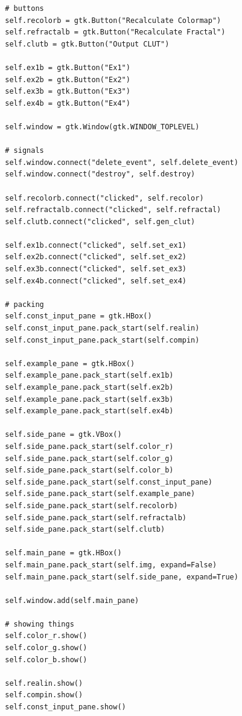 \documentclass{article}
\begin{document}
\begin{lstlisting}
        # buttons
        self.recolorb = gtk.Button("Recalculate Colormap")
        self.refractalb = gtk.Button("Recalculate Fractal")
        self.clutb = gtk.Button("Output CLUT")

        self.ex1b = gtk.Button("Ex1")
        self.ex2b = gtk.Button("Ex2")
        self.ex3b = gtk.Button("Ex3")
        self.ex4b = gtk.Button("Ex4")

        self.window = gtk.Window(gtk.WINDOW_TOPLEVEL)

        # signals
        self.window.connect("delete_event", self.delete_event)
        self.window.connect("destroy", self.destroy)

        self.recolorb.connect("clicked", self.recolor)
        self.refractalb.connect("clicked", self.refractal)
        self.clutb.connect("clicked", self.gen_clut)

        self.ex1b.connect("clicked", self.set_ex1)
        self.ex2b.connect("clicked", self.set_ex2)
        self.ex3b.connect("clicked", self.set_ex3)
        self.ex4b.connect("clicked", self.set_ex4)

        # packing
        self.const_input_pane = gtk.HBox()
        self.const_input_pane.pack_start(self.realin)
        self.const_input_pane.pack_start(self.compin)

        self.example_pane = gtk.HBox()
        self.example_pane.pack_start(self.ex1b)
        self.example_pane.pack_start(self.ex2b)
        self.example_pane.pack_start(self.ex3b)
        self.example_pane.pack_start(self.ex4b)

        self.side_pane = gtk.VBox()
        self.side_pane.pack_start(self.color_r)
        self.side_pane.pack_start(self.color_g)
        self.side_pane.pack_start(self.color_b)
        self.side_pane.pack_start(self.const_input_pane)
        self.side_pane.pack_start(self.example_pane)
        self.side_pane.pack_start(self.recolorb)
        self.side_pane.pack_start(self.refractalb)
        self.side_pane.pack_start(self.clutb)

        self.main_pane = gtk.HBox()
        self.main_pane.pack_start(self.img, expand=False)
        self.main_pane.pack_start(self.side_pane, expand=True)

        self.window.add(self.main_pane)

        # showing things
        self.color_r.show()
        self.color_g.show()
        self.color_b.show()

        self.realin.show()
        self.compin.show()
        self.const_input_pane.show()


\end{lstlisting}
\end{document}

